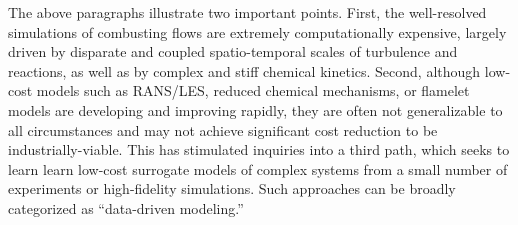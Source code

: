 The above paragraphs illustrate two important points. First, the well-resolved simulations of combusting flows are extremely computationally expensive, largely driven by disparate and coupled spatio-temporal scales of turbulence and reactions, as well as by complex and stiff chemical kinetics. Second, although low-cost models such as RANS/LES, reduced chemical mechanisms, or flamelet models are developing and improving rapidly, they are often not generalizable to all circumstances and may not achieve significant cost reduction to be industrially-viable. This has stimulated inquiries into a third path, which seeks to learn learn low-cost surrogate models of complex systems from a small number of experiments or high-fidelity simulations. Such approaches can be broadly categorized as ``data-driven  modeling.''